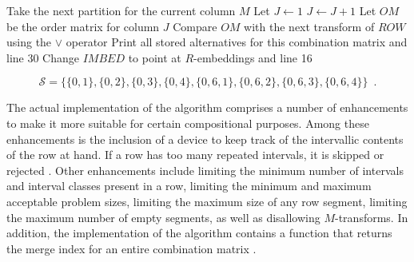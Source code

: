\setlength{\interspacetitleruled}{0pt}%
\setlength{\algotitleheightrule}{0pt}%

\begin{algorithm2e}
\DontPrintSemicolon
\setcounter{AlgoLine}{39}
Take the next partition for the current column $M$\;
Let $J \gets 1$\;
$J \gets J + 1$\;
Let $OM$ be the order matrix for column $J$\;
Compare $OM$ with the next transform of $ROW$ using the $\lor$ operator\;
Print all stored alternatives for this combination matrix and \KwGoTo line 30\;
Change $IMBED$ to point at $R$-embeddings and \KwGoTo line 16\;
\end{algorithm2e}

\begin{equation}
	\label{eq:initial-segment}
	\mathcal{S} = \{\{0, 1\}, \{0, 2\}, \{0, 3\}, \{0, 4\}, \{0, 6, 1\}, \{0, 6, 2\}, \{0, 6, 3\}, \{0, 6, 4\}\} \enspace.
\end{equation}

\noindent The actual implementation of the algorithm comprises a number of enhancements to make it more suitable for certain compositional purposes. Among these enhancements is the inclusion of a device to keep track of the intervallic contents of the row at hand. If a row has too many repeated intervals, it is skipped or rejected \cite[37]{Kowalski1987b}. Other enhancements include limiting the minimum number of intervals and interval classes present in a row, limiting the minimum and maximum acceptable problem sizes, limiting the maximum size of any row segment, limiting the maximum number of empty segments, as well as disallowing $M$-transforms. In addition, the implementation of the algorithm contains a function that returns the merge index for an entire combination matrix \cite[38]{Kowalski1987b}.

